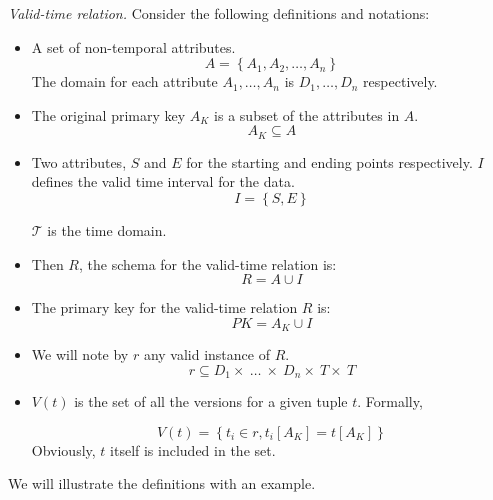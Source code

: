 \documentclass{llncs}
\newcommand{\T}{\mathcal{T}}
\begin{document}
\begin{definition}
\label{def:valid-time-relation}
\emph{Valid-time relation.}
Consider the following definitions and notations:

\begin{itemize}
 \item A set of non-temporal attributes.
	\begin{equation}
	\label{eq:attribute-set}
	A = \left \lbrace A_1, A_2, \ldots, A_n \right \rbrace
	\end{equation}
      The domain for each attribute $A_1, \ldots, A_n$ is $D_1, \ldots, D_n$ respectively. 
\item The original primary key $A_K$ is a subset of the attributes in $A$.
      \begin{equation}
       \label{eq:primary-key-a}
      A_K \subseteq A
      \end{equation}
\item Two attributes, $S$  and $E$ for the starting and ending points respectively. $I$ defines the valid time interval for the data. 
\begin{equation}
 \label{eq:attribute-time-interval}
I = \left \lbrace S, E \right \rbrace
\end{equation}

$\T$ is the time domain.

\item Then $R$, the schema for the valid-time relation is:
\begin{equation}
 \label{eq:valid-time-relation}
R = A \cup  I
\end{equation}
\item The primary key for the valid-time relation $R$ is:
\begin{equation}
 \label{eq:valid-time-temporal-pk}
PK = A_K \cup I
\end{equation}


\item We will note by $r$ any valid instance of $R$. 
      \begin{equation}
       \label{eq:valid-time-instance}
      r \subseteq D_1\times \ \ldots\ \times \ D_n \times \ T \times \ T
      \end{equation}


\item $V(t)$ is the set of all the versions for a given tuple $t$. Formally,

\begin{equation}
 \label{eq:all-the-versions}
V(t) =\left \lbrace t_i \in r, t_i\left[A_K\right] = t\left[A_K\right] \right \rbrace
\end{equation}
Obviously, $t$ itself is included in the set.
\end{itemize}
\end{definition}
We will illustrate the definitions with an example.
\end{document}
